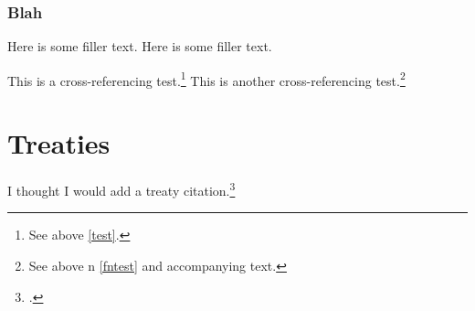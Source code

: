 \documentclass[titlepage,11pt]{lawessay}
\begin{document}
\subsubsection{Blah}
Here is some filler text.
Here is some filler text.

\label{test}
This is a cross-referencing test.\footnote{See above \ref{test}.}
This is another cross-referencing test.\footnote{See above n \ref{fntest} and accompanying text.}

\clearpage
\section{Treaties}
I thought I would add a treaty citation.\footcite{CEDAW}


\begin{Bibliography}
\printbibliography[heading=articles,filter=articles]
\printbibliography[heading=cases,filter=cases]
\printbibliography[heading=legislation,filter=legislation]
\printbibliography[heading=treaties,filter=treaties]
\end{Bibliography}
\end{document}

